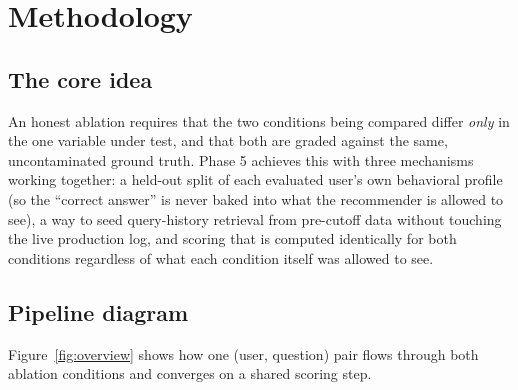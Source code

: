 \documentclass[11pt,a4paper]{article}
\begin{document}
\section{Methodology}

\subsection{The core idea}

An honest ablation requires that the two conditions being compared differ \emph{only} in the one
variable under test, and that both are graded against the same, uncontaminated ground truth.
Phase 5 achieves this with three mechanisms working together: a held-out split of each evaluated
user's own behavioral profile (so the ``correct answer'' is never baked into what the recommender
is allowed to see), a way to seed query-history retrieval from pre-cutoff data without touching the
live production log, and scoring that is computed identically for both conditions regardless of
what each condition itself was allowed to see.

\subsection{Pipeline diagram}

Figure~\ref{fig:overview} shows how one (user, question) pair flows through both ablation
conditions and converges on a shared scoring step.
\end{document}
